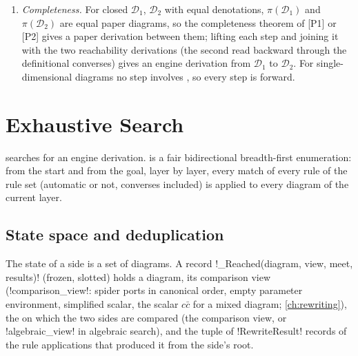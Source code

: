 \begin{enumerate}
  ; converses with free variables are applied with the values of the paper's
  instance through \azx!with NAME=VALUE!, which the pattern verifies.
\item \emph{Completeness.} For closed $\mathcal D_1$, $\mathcal D_2$ with equal denotations,
  $\pi(\mathcal D_1)$ and $\pi(\mathcal D_2)$ are equal paper diagrams, so the completeness theorem
  of [P1] or [P2] gives a paper derivation between them; lifting each step and joining it with the
  two reachability derivations (the second read backward through the definitional converses) gives
  an engine derivation from $\mathcal D_1$ to $\mathcal D_2$. For single-dimensional diagrams no
  step involves , so every step is forward.
\end{enumerate}

\section{Exhaustive Search}\label{sec:completeness-exhaustive}

 searches for an engine derivation. 
is a fair bidirectional breadth-first enumeration: from the start and from the goal, layer by layer,
every match of every rule of the rule set (automatic or not, converses included) is applied to
every diagram of the current layer.

\subsection{State space and deduplication}

The state of a side is a set of  diagrams. A record
\py!_Reached(diagram, view, meet, results)! (frozen, slotted) holds a diagram, its comparison view
(\py!comparison_view!: spider ports in canonical order, empty parameter environment, simplified
scalar, the scalar $c\bar c$ for a mixed diagram; \cref{ch:rewriting}), the  on
which the two sides are compared (the comparison view, or \py!algebraic_view! in algebraic search),
and the tuple of \py!RewriteResult! records of the rule applications that produced it from the
side's root.

